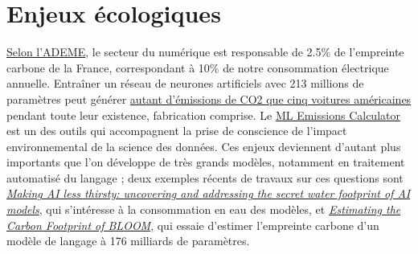 \section{Enjeux écologiques}
\label{sec:ecology}
\href{https://infos.ademe.fr/magazine-avril-2022/faits-et-chiffres/numerique-quel-impact-environnemental/}{Selon
  l'ADEME}, le secteur du numérique est responsable de 2.5\% de l'empreinte carbone de la France, correspondant à 10\% de notre consommation électrique annuelle. Entraîner un réseau de neurones artificiels avec 213 millions de
paramètres peut générer \href{https://arxiv.org/abs/1906.02243}{autant
  d'émissions de CO2 que cinq voitures américaines} pendant toute leur
existence, fabrication comprise. Le
\href{https://mlco2.github.io/impact/}{ML Emissions Calculator}
est un des outils qui accompagnent la prise de conscience de l'impact
environnemental de la science des données. Ces enjeux deviennent d'autant plus importants que l'on développe de très grands modèles, notamment en traitement automatisé du langage ; deux exemples récents de travaux sur ces questions sont \href{https://arxiv.org/abs/2304.03271}{\textit{Making AI less thirsty: uncovering and addressing the secret water footprint of AI models}}, qui s'intéresse à la consommation en eau des modèles, et \href{https://arxiv.org/abs/2211.02001}{\textit{Estimating the Carbon Footprint of BLOOM}}, qui essaie d'estimer l'empreinte carbone d'un modèle de langage à 176 milliards de paramètres.

